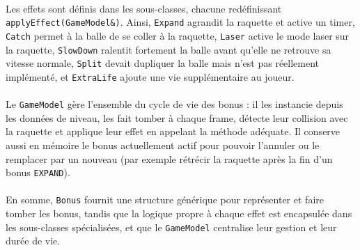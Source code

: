 \documentclass[12pt]{article}
\begin{document}
\paragraph{}
Les effets sont définis dans les sous-classes, chacune redéfinissant \colorbox{gray!20}{\texttt{applyEffect(GameModel\&)}}. Ainsi, \colorbox{gray!20}{\texttt{Expand}} agrandit la raquette et active un timer, \colorbox{gray!20}{\texttt{Catch}} permet à la balle de se coller à la raquette, \colorbox{gray!20}{\texttt{Laser}} active le mode laser sur la raquette, \colorbox{gray!20}{\texttt{SlowDown}} ralentit fortement la balle avant qu’elle ne retrouve sa vitesse normale, \colorbox{gray!20}{\texttt{Split}} devait dupliquer la balle mais n’est pas réellement implémenté, et \colorbox{gray!20}{\texttt{ExtraLife}} ajoute une vie supplémentaire au joueur.
\paragraph{}
Le \colorbox{gray!20}{\texttt{GameModel}} gère l’ensemble du cycle de vie des bonus : il les instancie depuis les données de niveau, les fait tomber à chaque frame, détecte leur collision avec la raquette et applique leur effet en appelant la méthode adéquate. Il conserve aussi en mémoire le bonus actuellement actif pour pouvoir l’annuler ou le remplacer par un nouveau (par exemple rétrécir la raquette après la fin d’un bonus \colorbox{gray!20}{\texttt{EXPAND}}).
\paragraph{}
En somme, \colorbox{gray!20}{\texttt{Bonus}} fournit une structure générique pour représenter et faire tomber les bonus, tandis que la logique propre à chaque effet est encapsulée dans les sous-classes spécialisées, et que le \colorbox{gray!20}{\texttt{GameModel}} centralise leur gestion et leur durée de vie.




\newpage
\end{document}
